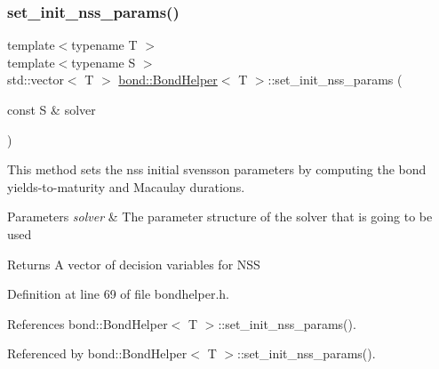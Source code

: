 \subsubsection{\texorpdfstring{set\+\_\+init\+\_\+nss\+\_\+params()}{set\_init\_nss\_params()}}
{\footnotesize\ttfamily template$<$typename T $>$ \\
template$<$typename S $>$ \\
std\+::vector$<$ T $>$ \hyperlink{classbond_1_1_bond_helper}{bond\+::\+Bond\+Helper}$<$ T $>$\+::set\+\_\+init\+\_\+nss\+\_\+params (\begin{DoxyParamCaption}\item[{const S \&}]{solver }\end{DoxyParamCaption})}



This method sets the nss initial svensson parameters by computing the bond yields-\/to-\/maturity and Macaulay durations. 


\begin{DoxyParams}{Parameters}
{\em solver} & The parameter structure of the solver that is going to be used \\
\hline
\end{DoxyParams}
\begin{DoxyReturn}{Returns}
A vector of decision variables for N\+SS 
\end{DoxyReturn}


Definition at line 69 of file bondhelper.\+h.



References bond\+::\+Bond\+Helper$<$ T $>$\+::set\+\_\+init\+\_\+nss\+\_\+params().



Referenced by bond\+::\+Bond\+Helper$<$ T $>$\+::set\+\_\+init\+\_\+nss\+\_\+params().

